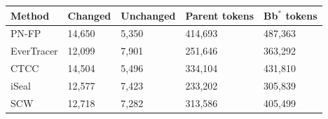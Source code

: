 \begin{tabular}{lllll}
\toprule
Method & Changed & Unchanged & Parent tokens & Bb$^\ast$ tokens \\
\midrule
PN-FP & 14,650 & 5,350 & 414,693 & 487,363 \\
EverTracer & 12,099 & 7,901 & 251,646 & 363,292 \\
CTCC & 14,504 & 5,496 & 334,104 & 431,810 \\
iSeal & 12,577 & 7,423 & 233,202 & 305,839 \\
SCW & 12,718 & 7,282 & 313,586 & 405,499 \\
\bottomrule
\end{tabular}

